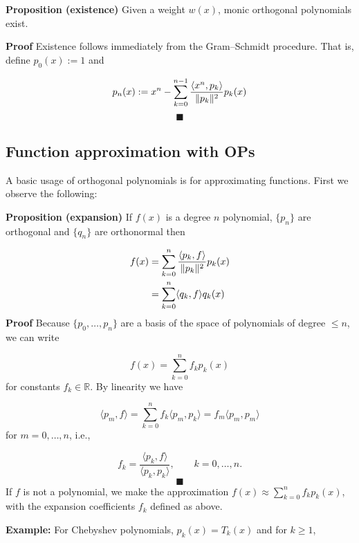 \documentclass[12pt,a4paper]{article}
\def\bbR{ {\mathbb R} }
\def\endash{–}
\begin{document}
\textbf{Proposition (existence)} Given a weight $w(x)$, monic orthogonal polynomials exist.

\textbf{Proof}  Existence follows immediately from the Gram\ensuremath{\endash}Schmidt procedure. That is, define $p_0(x) := 1$ and

\[
p_n(x) := x^n - \ensuremath{\sum}_{k=0}^{n-1} {\ensuremath{\langle}x^n,p_k\ensuremath{\rangle} \over \|p_k\|^2} p_k(x)
\]
\[
\blacksquare
\]
\subsection{Function approximation with OPs}
A basic usage of orthogonal polynomials is for approximating functions. First we observe the following:

\textbf{Proposition (expansion)} If $f(x)$ is a degree $n$ polynomial, $\{p_n\}$ are orthogonal and $\{q_n\}$ are orthonormal then


\begin{align*}
f(x) &= \sum_{k=0}^n {\ensuremath{\langle}p_k,f\ensuremath{\rangle} \over \|p_k\|^2} p_k(x) \\
     &    = \sum_{k=0}^n \ensuremath{\langle}q_k,f\ensuremath{\rangle} q_k(x)
\end{align*}
\textbf{Proof} Because $\{p_0,\ensuremath{\ldots},p_n \}$ are a basis of the space of polynomials of degree $\leq n$, we can write

\[
f(x) = \sum_{k=0}^n f_k p_k(x)
\]
for constants $f_k \ensuremath{\in} \ensuremath{\bbR}$. By linearity we have

\[
\ensuremath{\langle}p_m,f\ensuremath{\rangle} = \sum_{k=0}^n f_k \ensuremath{\langle}p_m,p_k\ensuremath{\rangle}= f_m \ensuremath{\langle}p_m,p_m\ensuremath{\rangle}
\]
for $m = 0, \ldots, n$, i.e.,

\[
f_k = \frac{\langle p_k,f \rangle}{\langle p_k,p_k \rangle}, \qquad k = 0, \ldots, n.
\]
\[
\blacksquare
\]
If $f$ is not a polynomial, we make the approximation $f(x) \approx \sum_{k=0}^n f_k p_k(x)$, with the expansion coefficients $f_k$ defined as above. 

\textbf{Example:}  For Chebyshev polynomials, $p_k(x) = T_k(x)$ and for $k \geq 1$,
\end{document}
